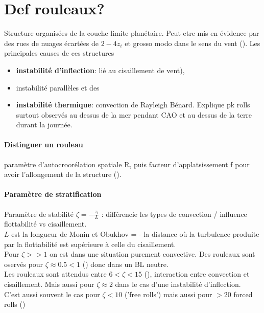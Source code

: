 \section{Def rouleaux?}

Structure organisées de la couche limite planétaire. Peut etre mis en évidence par des rues de nuages écartées de $2-4 z_i$ et grosso modo dans le sens du vent (\cite{etlingRollVorticesPlanetary1993}). Les principales causes de ces structures 
\begin{itemize}
	\item \textbf{instabilité d'inflection}: lié au cisaillement de vent), 
	
	\item instabilité parallèles et des 
	
	\item \textbf{instabilité thermique}: convection de Rayleigh Bénard. Explique pk rolls surtout observés au dessus de la mer pendant CAO et au dessus de la terre durant la journée. 
	
\end{itemize}

\paragraph{Distinguer un rouleau}
paramètre d'autocroorélation spatiale R, puis facteur d'applatsissement f pour avoir l'allongement de la structure (\cite{lfarhImpactSurfaceTurbulent2024}).

\paragraph{Paramètre de stratification}
Paramètre de stabilité  $\zeta = -\frac{z_i}{L}$ : différencie les types de convection / influence flottabilité vs cisaillement.\\ 
$L$ est la longueur de Monin et Obukhov = - la distance où la turbulence produite par la flottabilité est supérieure à celle du cisaillement. \\
Pour $\zeta >> 1$ on est dans une situation purement convective. Des rouleaux sont oservés pour $\zeta \approx 0.5 < 1$ (\cite{lfarhImpactSurfaceTurbulent2024}) donc dans un BL neutre. \\
Les rouleaux sont attendus entre $6<\zeta<15$ (\cite{etlingRollVorticesPlanetary1993}), interaction entre convection et cisaillement. Mais aussi pour $\zeta \approx 2$ dans le cas d'une instabilité d'inflection. \\
C'est aussi souvent le cas pour $\zeta < 10$ ('free rolls') mais aussi pour $>20$ forced rolls
(\cite{gryschkaImpactForcedRoll2014}) 
